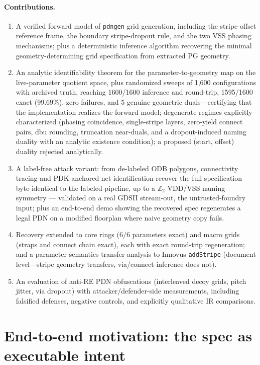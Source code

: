 \documentclass[11pt]{article}
\begin{document}
\paragraph{Contributions.}
\begin{enumerate}
\item A verified forward model of \texttt{pdngen} grid generation,
including the stripe-offset reference frame, the boundary
stripe-dropout rule, and the two VSS phasing mechanisms; plus a
deterministic inference algorithm recovering the minimal
geometry-determining grid specification from extracted PG geometry.
\item An analytic identifiability theorem for the
parameter-to-geometry map on the live-parameter quotient space, plus
randomized sweeps of 1{,}600 configurations with archived truth,
reaching 1600/1600 inference and round-trip, 1595/1600 exact
(99.69\%), zero failures, and 5 genuine geometric duals---certifying
that the implementation realizes the forward model; degenerate regimes explicitly characterized
(phasing coincidence, single-stripe layers, zero-yield connect pairs,
dbu rounding, truncation near-duals, and a dropout-induced naming
duality with an analytic existence condition); a proposed (start,
offset) duality rejected analytically.
\item A label-free attack variant: from de-labeled ODB polygons,
connectivity tracing and PDK-anchored net identification recover the
full specification byte-identical to the labeled pipeline, up to a
$\mathbb{Z}_2$ VDD/VSS naming symmetry --- validated on a real GDSII
stream-out, the untrusted-foundry input; plus an end-to-end demo showing
the recovered spec regenerates a legal PDN on a modified floorplan
where naive geometry copy fails.
\item Recovery extended to core rings (6/6 parameters exact) and macro
grids (straps and connect chain exact), each with exact round-trip
regeneration; and a parameter-semantics transfer analysis to Innovus
\texttt{addStripe} (document level---stripe geometry transfers, via/connect
inference does not).
\item An evaluation of anti-RE PDN obfuscations (interleaved decoy grids,
pitch jitter, via dropout) with attacker/defender-side measurements,
including falsified defenses, negative controls, and explicitly
qualitative IR comparisons.
\end{enumerate}

\section{End-to-end motivation: the spec as executable intent}
\label{sec:e2e}
\end{document}
